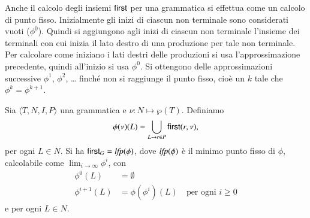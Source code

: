 Anche il calcolo degli insiemi $\mathsf{first}$ per una grammatica si effettua
come un calcolo di punto fisso. Inizialmente gli inizi di ciascun non
terminale sono considerati vuoti ($\phi^0$). Quindi si aggiungono
agli inizi di ciascun non terminale l'insieme dei terminali con cui
inizia il lato destro di una produzione per tale non terminale.
Per calcolare come iniziano i lati destri delle produzioni
si usa l'approssimazione precedente, quindi all'inizio si usa $\phi^0$.
Si ottengono \cosi delle approssimazioni successive $\phi^1$, $\phi^2$, \ldots
finch\'e non si raggiunge il punto fisso, cio\`e un $k$ tale che
$\phi^k=\phi^{k+1}$.
%
\begin{proposition}\label{prop:first}
Sia $\langle T,N,I,P\rangle$ una grammatica e $\nu:N\mapsto\wp(T)$. Definiamo
\[
  \phi(\nu)(L)=\bigcup\limits_{L\to r\in P}\mathsf{first}(r,\nu),
\]
per ogni $L\in N$.
Si ha $\mathsf{first}_G=\mathit{lfp}(\phi)$, dove $\mathit{lfp}(\phi)$ \`e il minimo punto
fisso di $\phi$, calcolabile come $\lim_{i\to\infty}\phi^i$, con
\begin{align*}
  \phi^0(L)&=\emptyset\\
  \phi^{i+1}(L)&=\phi(\phi^i)(L)\quad\text{per ogni $i\ge 0$}
\end{align*}
e per ogni $L\in N$.
\end{proposition}

